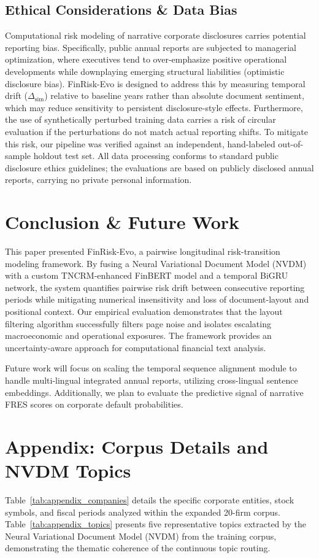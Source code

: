 \documentclass[journal]{IEEEtran}
\begin{document}
\subsection{Ethical Considerations \& Data Bias}
Computational risk modeling of narrative corporate disclosures carries potential reporting bias. Specifically, public annual reports are subjected to managerial optimization, where executives tend to over-emphasize positive operational developments while downplaying emerging structural liabilities (optimistic disclosure bias). FinRisk-Evo is designed to address this by measuring temporal drift ($\Delta_{\text{sim}}$) relative to baseline years rather than absolute document sentiment, which may reduce sensitivity to persistent disclosure-style effects. Furthermore, the use of synthetically perturbed training data carries a risk of circular evaluation if the perturbations do not match actual reporting shifts. To mitigate this risk, our pipeline was verified against an independent, hand-labeled out-of-sample holdout test set. All data processing conforms to standard public disclosure ethics guidelines; the evaluations are based on publicly disclosed annual reports, carrying no private personal information.

\section{Conclusion \& Future Work}
This paper presented FinRisk-Evo, a pairwise longitudinal risk-transition modeling framework. By fusing a Neural Variational Document Model (NVDM) with a custom TNCRM-enhanced FinBERT model and a temporal BiGRU network, the system quantifies pairwise risk drift between consecutive reporting periods while mitigating numerical insensitivity and loss of document-layout and positional context. Our empirical evaluation demonstrates that the layout filtering algorithm successfully filters page noise and isolates escalating macroeconomic and operational exposures. The framework provides an uncertainty-aware approach for computational financial text analysis.

Future work will focus on scaling the temporal sequence alignment module to handle multi-lingual integrated annual reports, utilizing cross-lingual sentence embeddings. Additionally, we plan to evaluate the predictive signal of narrative FRES scores on corporate default probabilities.

\section*{Appendix: Corpus Details and NVDM Topics}
Table~\ref{tab:appendix_companies} details the specific corporate entities, stock symbols, and fiscal periods analyzed within the expanded 20-firm corpus. Table~\ref{tab:appendix_topics} presents five representative topics extracted by the Neural Variational Document Model (NVDM) from the training corpus, demonstrating the thematic coherence of the continuous topic routing.
\end{document}
